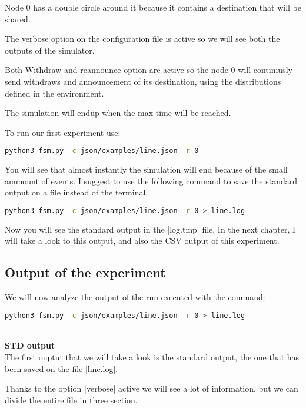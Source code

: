 \documentclass[10pt,journal,onecolumn]{IEEEtran}
\begin{document}
Node $0$ has a double circle around it because it contains a destination that will
be shared.

The verbose option on the configuration file is active so we will see both
the outputs of the simulator.

Both Withdraw and reannounce option are active so the node 0 will continiusly
send withdraws and announcement of its destination, using the distributions defined
in the environment.

The simulation will endup when the max time will be reached.

To run our first experiment use:

\begin{lstlisting}[language=bash]
	python3 fsm.py -c json/examples/line.json -r 0
\end{lstlisting}

You will see that almost instantly the simulation will end because of the
small ammount of events.
I suggest to use the following command to save the standard output on a file
instead of the terminal.

\begin{lstlisting}[language=bash]
	python3 fsm.py -c json/examples/line.json -r 0 > line.log
\end{lstlisting}

Now you will see the standard output in the |log.tmp| file.
In the next chapter,  I will take a look to this 
output, and also the CSV output of this experiment.

\subsection{Output of the experiment}
\label{subsec:des_output}

We will now analyze the output of the run executed with the command:

\begin{lstlisting}[language=bash]
	python3 fsm.py -c json/examples/line.json -r 0 > line.log
\end{lstlisting}

\\
\textbf{STD output}
\\

The first ouptut that we will take a look is the standard output, the one that
has been saved on the file |line.log|.

Thanks to the option |verbose| active we will see a lot of information, but 
we can divide the entire file in three section.
\end{document}
